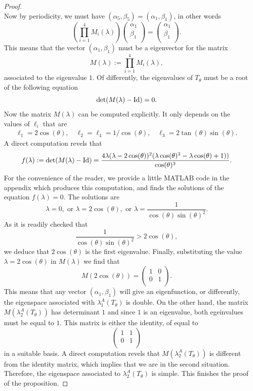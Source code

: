 \documentclass[12pt,english]{smfart} %
\theoremstyle{remark}
\begin{document}
\begin{proof}
$$ $$
Now by periodicity, we must have $(\alpha_{5},\beta_5)=(\alpha_1,\beta_1)$, in other words 
$$\left(\prod_{i=1}^4 M_i(\lambda) \right) \left(
\begin{array}{c}
\alpha_{1} \\
\beta_{1}\\
\end{array}
\right)=
\left(\begin{array}{c}
\alpha_{1} \\
\beta_{1}\\
\end{array}
\right).
$$
This means that the vector $(\alpha_1,\beta_1)$ must be a eigenvector for the matrix 
$$M(\lambda):=\prod_{i=1}^4 M_i(\lambda),$$
associated to the eigenvalue $1$.  Of differently, the eigenvalues of $T_\theta$ must be a root of  the following equation
$${\rm det } (M(\lambda)-\textnormal{Id})=0.$$
Now the matrix $M(\lambda)$ can be computed explicitly. It only depends on the values of $\ell_i$ that are
\begin{align*}
    \ell_1= 2\cos(\theta), \quad   \ell_2=\ell_4=1/\cos(\theta), \quad
\ell_3= 2\tan(\theta)\sin(\theta).
\end{align*}
A direct computation revels that 
$$f(\lambda):={\rm det } (M(\lambda)-\textnormal{Id})=
\frac{4 \lambda (\lambda - 2\cos(\theta))^2(\lambda \cos(\theta)^3 - \lambda \cos(\theta) + 1))}{\cos(\theta)^3}.
$$
For the convenience of the reader, we provide a little MATLAB code in the appendix which produces this computation, and finds the solutions of the equation $f(\lambda)=0$.  The solutions are  
$$
\lambda=0, \text{ or } \lambda=2\cos(\theta),  \text{ or }  \lambda=\frac{1}{\cos(\theta)\sin(\theta)^2}.
$$
As it is readily checked that 
$$\frac{1}{\cos(\theta)\sin(\theta)^2} > 2\cos(\theta),$$
we deduce that $2\cos(\theta)$ is the first eigenvalue. Finally, substituting the value $\lambda=2\cos(\theta)$ in $M(\lambda)$ we find that 
$$M(2\cos(\theta))=
\left(
\begin{array}{cc}
1 & 0 \\
0  &  1\\
\end{array}
\right).
$$
This means that any vector $(\alpha_1,\beta_1)$ will give an eigenfunction, or differently, the eigenspace associated with $\lambda_1^A(T_\theta)$ is double. On the other hand, the matrix $M(\lambda_2^A(T_\theta))$ has determinant $1$ and since $1$ is an eigenvalue, both egeinvalues must be equal to $1$.  This matrix is either the identity, of equal to
$$
\left(
\begin{array}{cc}
1 & 1 \\
0  &  1\\
\end{array}
\right)
$$
in a suitable basis. A direct computation revels that $M(\lambda_2^A(T_\theta))$ is different from the identity matrix, which implies that we are in the second situation. Therefore, the eigenspace associated to $\lambda_2^A(T_\theta)$ is simple. This finishes the proof of the proposition. 
 \end{proof}
\end{document}
